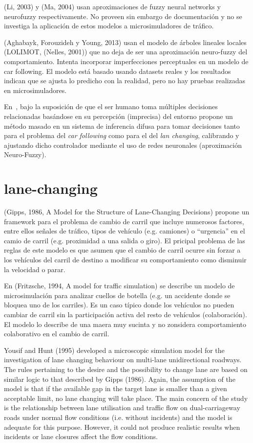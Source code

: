 (Li, 2003) y (Ma, 2004) usan aproximaciones de fuzzy neural networks y neurofuzzy respectivamente. No proveen sin embargo de documentación y no se investiga la aplicación de estos modelos a microsimuladores de tráfico.

(Aghabayk, Forouzideh y Young, 2013) usan el modelo de árboles lineales locales (LOLIMOT, (Nelles, 2001)) que no deja de ser una aproximación neuro-fuzzy del comportamiento. Intenta incorporar imperfecciones perceptuales en un modelo de car following. El modelo está basado usando datasets reales y los resultados indican que se ajusta lo predicho con la realidad, pero no hay pruebas realizadas en microsimuladores.

En~\cite{Ma}, bajo la suposición de que el ser humano toma múltiples decisiones relacionadas basándose en su percepción (imprecisa) del entorno propone un método masado en un sistema de inferencia difusa para tomar decisiones tanto para el problema del \textit{car following} como para el del \textit{lan changing}, calibrando y ajustando dicho controlador mediante el uso de redes neuronales (aproximación Neuro-Fuzzy).



\section{lane-changing}

(Gipps, 1986, A Model for the Structure of Lane-Changing Decisions) propone un framework para el problema de cambio de carril que incluye numerosos factores, entre ellos señales de tráfico, tipos de vehículo (e.g. camiones) o \enquote{urgencia} en el camio de carril (e.g. proximidad a una salida o giro). El pricipal problema de las reglas de este modelo es que asumen que el cambio de carril ocurre sin forzar a los vehículos del carril de destino a modificar su comportamiento como disminuir la velocidad o parar.

En (Fritzsche, 1994, A model for traffic simulation) se describe un modelo de microsimulación para analizar cuellos de botella (e.g. un accidente donde se bloquea uno de los carriles). Es un caso típico donde los vehículos no pueden cambiar de carril sin la participación activa del resto de vehículos (colaboración). El modelo lo describe de una maera muy sucinta y no zonsidera comportamiento colaborativo en el cambio de carril.

Yousif and Hunt (1995) developed a microscopic simulation model for the investigation of lane changing behaviour on multi-lane unidirectional roadways. The rules pertaining to the desire and the possibility to change lane are based on similar logic to that described by Gipps (1986). Again, the assumption of the model is that if the available gap in the target lane is smaller than a given acceptable limit, no lane changing will take place. The main concern of the study is the relationship between lane utilisation and traffic flow on dual-carriageway roads under normal flow conditions (i.e. without incidents) and the model is adequate for this purpose. However, it could not produce realistic results when incidents or lane closures affect the flow conditions.

